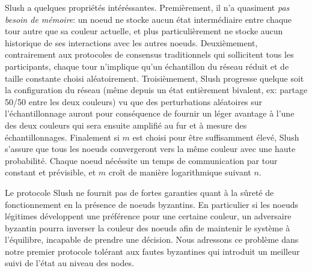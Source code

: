 \documentclass[letterpaper,twocolumn,10pt]{article}
\newcommand{\tronly}[2]{#1}
\theoremstyle{definition}
\begin{document}

Slush a quelques propriétés intéréssantes. Premièrement, il n'a quasiment \emph{pas besoin de mémoire}: un noeud ne
stocke aucun état intermédiaire entre chaque tour autre que sa couleur actuelle, et plus particulièrement ne stocke
aucun historique de ses interactions avec les autres noeuds. Deuxièmement, contrairement aux protocoles de consensus
traditionnels qui sollicitent tous les participants, chaque tour n'implique qu'un échantillon du réseau réduit et de
taille constante choisi aléatoirement. Troisièmement, Slush progresse quelque soit la configuration du réseau (même
depuis un état entièrement bivalent, ex: partage 50/50 entre les deux couleurs) vu que des perturbations aléatoires
sur l'échantillonnage auront pour conséquence de fournir un léger avantage à l'une des deux couleurs qui sera ensuite
amplifié au fur et à mesure des échantillonnages.
Finalement si $m$ est choisi pour être suffisamment élevé, Slush s'assure que tous les noeuds convergeront vers la
même couleur avec une haute probabilité. Chaque noeud nécéssite un temps de communication par tour constant et
prévisible, et $m$ croît de manière logarithmique suivant $n$.

\tronly{

Le protocole Slush ne fournit pas de fortes garanties quant à la sûreté de fonctionnement en la présence de noeuds
byzantins. En particulier si les noeuds légitimes développent une préférence pour une certaine couleur, un adversaire
byzantin pourra inverser la couleur des noeuds afin de maintenir le système à l'équilibre, incapable de prendre une
décision. Nous adressons ce problème dans notre premier protocole tolérant aux fautes byzantines qui introduit un
meilleur suivi de l'état au niveau des nodes.
}{
Nous examinons ensuite comment améliorer Slush pour être tolérant au problème des généraux byzantins.
}
\end{document}

